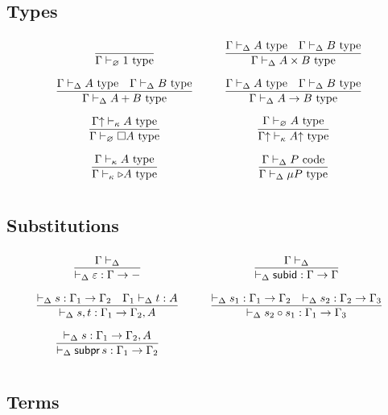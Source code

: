 \subsection*{Types}
\[\arraycolsep=15pt\def\arraystretch{2.8}
\begin{array}{cc}
\infer{\Gamma \vdash_{\varnothing} 1 \type}{} 
&
\infer{\Gamma \vdash_{\Delta} A \times B \type}{\Gamma \vdash_{\Delta} A \type & \Gamma \vdash_{\Delta} B \type}
\\
\infer{\Gamma \vdash_{\Delta} A + B \type}{\Gamma \vdash_{\Delta} A \type & \Gamma \vdash_{\Delta} B \type}
&
\infer{\Gamma \vdash_{\Delta} A \to B \type}{\Gamma \vdash_{\Delta} A \type & \Gamma \vdash_{\Delta} B \type} 
\\
\infer{\Gamma \vdash_{\varnothing} \square A \type}{\Gamma \up \vdash_{\kappa} A \type}
&
\infer{\Gamma \up \vdash_{\kappa} A \up \type}{\Gamma \vdash_{\varnothing} A \type}
\\
\infer{\Gamma \vdash_{\kappa} \later A \type}{\Gamma \vdash_{\kappa} A \type}
&
\infer{\Gamma \vdash_{\Delta} \mu P \type}{\Gamma \vdash_{\Delta} P \poly}
\end{array}
\]

\subsection*{Substitutions}
\[\arraycolsep=15pt\def\arraystretch{2.8}
\begin{array}{cc}
\infer{\vdash_{\Delta} \varepsilon : \Gamma \to -}{\Gamma \vdash_{\Delta}}
&
\infer{\vdash_{\Delta} \subid : \Gamma \to \Gamma}{\Gamma \vdash_{\Delta}}
\\
\infer{\vdash_{\Delta} s , t : \Gamma_1 \to \Gamma_2 , A}{\vdash_{\Delta} s : \Gamma_1 \to \Gamma_2 & \Gamma_1 \vdash_{\Delta} t : A}
&
\infer{\vdash_{\Delta} s_2 \circ s_1 : \Gamma_1 \to \Gamma_3}{\vdash_{\Delta} s_1 : \Gamma_1 \to \Gamma_2 & \vdash_{\Delta} s_2 : \Gamma_2 \to \Gamma_3}
\\
\infer{\vdash_{\Delta} \subpr \, s : \Gamma_1 \to \Gamma_2}{\vdash_{\Delta} s : \Gamma_1 \to \Gamma_2 , A}
&
\end{array}
\]

\subsection*{Terms}

